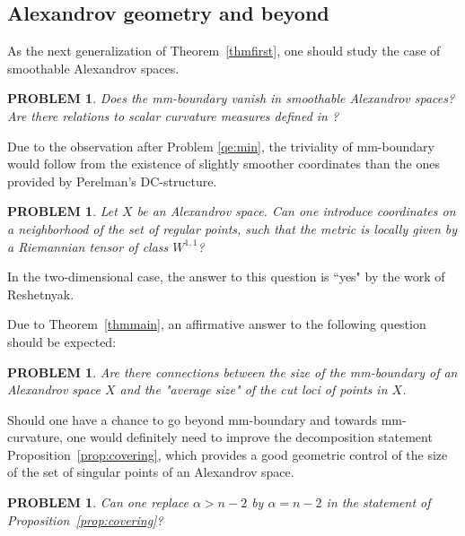 \documentclass[12pt,leqno,intlimits]{amsart}
\numberwithin{equation}{section}
\newtheorem{quest}[thm]{PROBLEM}
\theoremstyle{definition}
\theoremstyle{remark}
\newcommand{\tref}[1]{Theorem~\ref{#1}}
\newcommand{\pref}[1]{Proposition~\ref{#1}}
\begin{document}
\subsection{Alexandrov geometry and beyond}
As the next  generalization of \tref{thmfirst}, one should study  the case of smoothable Alexandrov spaces.

\begin{quest}
Does the mm-boundary vanish  in smoothable Alexandrov spaces?   Are there relations to scalar curvature measures defined in \cite{LP}?
\end{quest}


 Due to the observation after Problem \ref{qe:min}, the triviality of mm-boundary would follow from the existence of slightly smoother coordinates than the ones provided by Perelman's DC-structure.
\begin{quest}
Let $X$ be an Alexandrov space. Can one introduce coordinates on a neighborhood of the set of regular points, such that the metric is locally given by a Riemannian tensor of class $W^{1,1}$?
\end{quest}
In the two-dimensional case, the answer to this question is ``yes" by the work of Reshetnyak.


Due to  \tref{thmmain}, an affirmative answer to the following question should be expected:
\begin{quest}
Are there connections between the size of the mm-boundary of an Alexandrov space $X$ and the "average size" of the cut loci of  points in $X$.
\end{quest}



Should one have a chance to go beyond mm-boundary and towards mm-curvature, one would definitely need to improve the
decomposition statement \pref{prop:covering}, which provides a good geometric control of the size of the set of singular points of an Alexandrov space.
\begin{quest} \label{qe:control}
Can one replace $\alpha>n-2$ by $\alpha=n-2$ in the statement of \pref{prop:covering}?
\end{quest}
\end{document}
